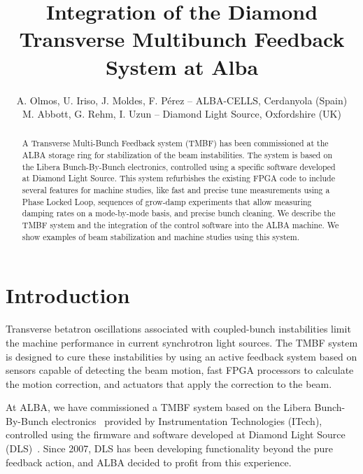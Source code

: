 \documentclass[a4paper,
              ]{jacow}
\begin{document}
\title{Integration of the Diamond Transverse Multibunch Feedback System at Alba}

\author{A. Olmos, U. Iriso, J. Moldes, F. P\'erez -- ALBA-CELLS, Cerdanyola (Spain) \\
M. Abbott, G. Rehm, I. Uzun -- Diamond Light Source, Oxfordshire (UK) }

\maketitle

%
\begin{abstract}
A Transverse Multi-Bunch Feedback system (TMBF) has been commissioned at the ALBA storage ring for stabilization of the beam instabilities. The system is based on the Libera Bunch-By-Bunch electronics, controlled using a specific software developed at Diamond Light Source. This system refurbishes the existing FPGA code to include several features for machine studies, like fast and precise tune measurements using a Phase Locked Loop, sequences of grow-damp experiments that allow measuring damping rates on a mode-by-mode basis, and precise bunch cleaning. We describe the TMBF system and the integration of the control software into the ALBA machine. We show examples of beam stabilization and machine studies using this system.

\end{abstract}


\section{Introduction}

Transverse betatron oscillations associated with coupled-bunch instabilities limit the machine performance in current synchrotron light sources. 
The TMBF system is designed to cure these instabilities by using an active feedback system based on sensors capable of detecting the beam motion, fast FPGA processors to calculate the motion correction, and actuators that apply the correction to the beam.

At ALBA, we have commissioned a TMBF system based on the Libera Bunch-By-Bunch electronics~\cite{iTech} provided by Instrumentation Technologies (ITech), controlled using the firmware and software developed at Diamond Light Source  (DLS)~\cite{DLS:IBIC15}. 
Since 2007, DLS has been developing functionality beyond the pure feedback action, and ALBA decided to profit from this experience. 
\end{document}
